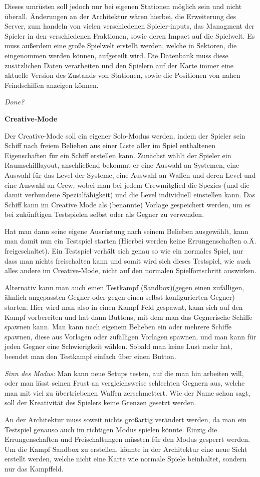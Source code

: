 \documentclass[fontsize=12pt,paper=a4,twoside]{scrartcl}
\begin{document}
Dieses umrüsten soll jedoch nur bei eigenen Stationen möglich sein und nicht überall. Änderungen an der Architektur wären hierbei, die Erweiterung des Server, zum handeln von vielen verschiedenen Spieler-inputs, das Managment der Spieler in den verschiedenen Fraktionen, sowie deren Impact auf die Spielwelt. Es muss außerdem eine große Spielwelt erstellt werden, welche in Sektoren, die eingenommen werden können, aufgeteilt wird. Die Datenbank muss diese zusätzlichen Daten verarbeiten und den Spielern auf der Karte immer eine aktuelle Version des Zustands von Stationen, sowie die Positionen von nahen Feindschiffen anzeigen können. 

\textit{Done?}




\textbf{Creative-Mode}
{
Der Creative-Mode soll ein eigener Solo-Modus werden, indem der Spieler sein Schiff nach freiem Belieben aus einer Liste aller im Spiel enthaltenen Eigenschaften für ein Schiff erstellen kann. Zunächst wählt der Spieler ein Raumschifflayout, anschließend bekommt er eine Auswahl an Systemen, eine Auswahl für das Level der Systeme, eine Auswahl an Waffen und deren Level und eine Auswahl an Crew, wobei man bei jedem Crewmitglied die Spezies (und die damit verbundene Spezialfähigkeit) und die Level individuell einstellen kann. 
Das Schiff kann im Creative Mode als (benannte) Vorlage gespeichert werden, um es bei zukünftigen Testspielen selbst oder als Gegner zu verwenden.

Hat man dann seine eigene Ausrüstung nach seinem Belieben ausgewählt, kann man damit nun ein Testspiel starten (Hierbei werden keine Errungenschaften o.Ä. freigeschaltet). Ein Testspiel verhält sich genau so wie ein normales Spiel, nur dass man nichts freischalten kann und somit wird sich dieses Testspiel, wie auch alles andere im Creative-Mode, nicht auf den normalen Spielfortschritt auswirken. 

Alternativ kann man auch einen Testkampf (Sandbox)(gegen einen zufälligen, ähnlich angepassten Gegner oder gegen einen selbst konfigurierten Gegner) starten. Hier wird man also in einen Kampf Feld gespawnt, kann sich auf den Kampf vorbereiten und hat dann Buttons, mit dem man das Gegnerische Schiffe spawnen kann. Man kann nach eigenem Belieben ein oder mehrere Schiffe spawnen, diese aus Vorlagen oder zufälligen Vorlagen spawnen, und man kann für jeden Gegner eine Schwierigkeit wählen. Sobald man keine Lust mehr hat, beendet man den Testkampf einfach über einen Button. 

\textit{Sinn des Modus:}
Man kann neue Setups testen, auf die man hin arbeiten will, oder man lässt seinen Frust an vergleichsweise schlechten Gegnern aus, welche man mit viel zu übertriebenen Waffen zerschmettert. Wie der Name schon sagt, soll der Kreativität des Spielers keine Grenzen gesetzt werden.

An der Architektur muss soweit nichts großartig verändert werden, da man ein Testspiel genauso auch im richtigen Modus spielen könnte. Einzig die Errungenschaften und Freischaltungen müssten für den Modus gesperrt werden. Um die Kampf Sandbox zu erstellen, könnte in der Architektur eine neue Sicht erstellt werden, welche nicht eine Karte wie normale Spiele beinhaltet, sondern nur das Kampffeld. 

}
\end{document}
